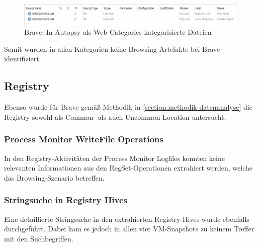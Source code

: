 \begin{appendices}

\begin{figure}[h!]
	\centering
	\includegraphics[width=\textwidth]{bilder/BRCat.png}
	\caption{Brave: In Autopsy als \glqq{}Web Categories\grqq{} kategorisierte Dateien}
	\label{img:brave-web-categories}  
\end{figure}

Somit wurden in allen Kategorien keine Browsing-Artefakte bei Brave identifiziert.

\subsection{Registry}\label{chap:anhang-brave-registry}

Ebenso wurde für Brave gemäß Methodik in \autoref{section:methodik-datenanalyse} die Registry sowohl als Common- als auch Uncommon Location untersucht.

\subsubsection*{Process Monitor WriteFile Operations}\label{chap:anhang-brave-common-locations-registry}
In den Registry-Aktivitäten der Process Monitor Logfiles konnten  keine relevanten Informationen aus den RegSet-Operationen extrahiert werden, welche das Browsing-Szenario betreffen.

\subsubsection*{Stringsuche in Registry Hives}\label{chap:anhang-brave-uncommon-locations-registry}
Eine detaillierte Stringsuche in den extrahierten Registry-Hives wurde ebenfalls durchgeführt. Dabei kam es jedoch in allen vier VM-Snapshots zu keinem Treffer mit den Suchbegriffen.

\end{appendices}